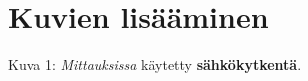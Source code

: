 \section{Kuvien lisääminen}
\begin{center}
Kuva 1: \textit{Mittauksissa} käytetty \textbf{sähkökytkentä}. \cite{harkat}
\end{center}